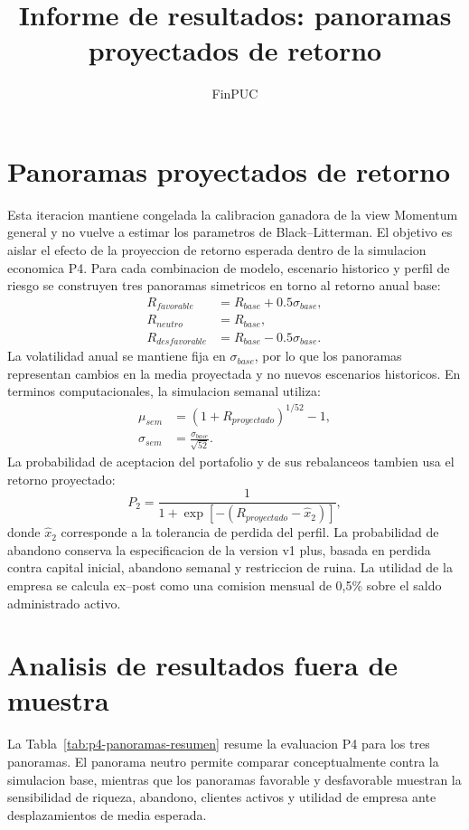 \documentclass[11pt]{article}
\title{Informe de resultados: panoramas proyectados de retorno}
\author{FinPUC}
\date{}
\begin{document}
\maketitle
\tableofcontents
\newpage

\section{Panoramas proyectados de retorno}
Esta iteracion mantiene congelada la calibracion ganadora de la view Momentum general y no vuelve a estimar los parametros de Black--Litterman. El objetivo es aislar el efecto de la proyeccion de retorno esperada dentro de la simulacion economica P4. Para cada combinacion de modelo, escenario historico y perfil de riesgo se construyen tres panoramas simetricos en torno al retorno anual base:
\begin{align}
R_{favorable} &= R_{base} + 0.5\sigma_{base},\\
R_{neutro} &= R_{base},\\
R_{desfavorable} &= R_{base} - 0.5\sigma_{base}.
\end{align}
La volatilidad anual se mantiene fija en $\sigma_{base}$, por lo que los panoramas representan cambios en la media proyectada y no nuevos escenarios historicos. En terminos computacionales, la simulacion semanal utiliza:
\begin{align}
\mu_{sem} &= (1+R_{proyectado})^{1/52}-1,\\
\sigma_{sem} &= \frac{\sigma_{base}}{\sqrt{52}}.
\end{align}
La probabilidad de aceptacion del portafolio y de sus rebalanceos tambien usa el retorno proyectado:
\begin{equation}
P_2 = \frac{1}{1+\exp\left[-(R_{proyectado}-\widehat{x}_2)\right]},
\end{equation}
donde $\widehat{x}_2$ corresponde a la tolerancia de perdida del perfil. La probabilidad de abandono conserva la especificacion de la version v1 plus, basada en perdida contra capital inicial, abandono semanal y restriccion de ruina. La utilidad de la empresa se calcula ex--post como una comision mensual de 0,5\% sobre el saldo administrado activo.

\section{Analisis de resultados fuera de muestra}
La Tabla~\ref{tab:p4-panoramas-resumen} resume la evaluacion P4 para los tres panoramas. El panorama neutro permite comparar conceptualmente contra la simulacion base, mientras que los panoramas favorable y desfavorable muestran la sensibilidad de riqueza, abandono, clientes activos y utilidad de empresa ante desplazamientos de media esperada.
\end{document}
